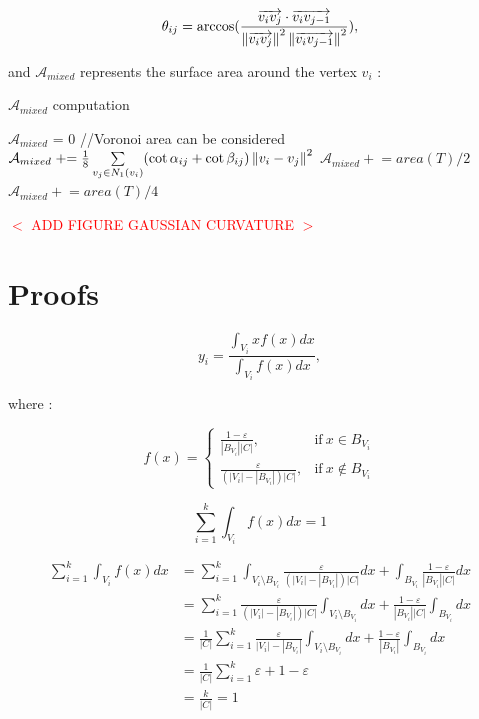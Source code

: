 \documentclass[11pt,fleqn]{book} %
\newcommand{\arnaud}[1]{\textcolor{red}{$<$ #1 $>$}}
\begin{document}
\begin{appendices}
\begin{equation}
	\theta_{ij} = \arccos(\frac{\overrightarrow{v_iv_j} \cdot \overrightarrow{v_i v_{j-1}}}
	{\left\lVert\overrightarrow{v_iv_j}\right\rVert^2\left\lVert\overrightarrow{v_iv_{j-1}}\right\rVert^2}),
\end{equation} 

and $\mathcal{A}_{mixed}$ represents the surface area around the vertex $v_i$ : 

\begin{algorithm}
\caption{$\mathcal{A}_{mixed}$ computation}
\begin{algorithmic}
\State $\mathcal{A}_{mixed}$ = 0
		//Voronoi area can be considered
		\State $\mathcal{A}_{mixed} \mathrel{+}= \frac{1}{8} \sum\limits_{v_j \in N_1(v_i)} (\cot \alpha_{ij} + \cot \beta_{ij}) \left\lVert v_i-v_j\right\rVert^2$
	\Else
			\State $\mathcal{A}_{mixed} \mathrel{+}= area(T)/2$
		\Else
			\State $\mathcal{A}_{mixed} \mathrel{+}= area(T)/4$
		\EndIf
	\EndIf
\EndFor
\end{algorithmic}
\end{algorithm}

\arnaud{ADD FIGURE GAUSSIAN CURVATURE}

\section{Proofs}

\begin{equation}
	y_i = \frac{\int_{V_i}xf(x)dx}{\int_{V_i}f(x)dx},
\end{equation}

where : 

\begin{equation}
	f(x) = 
    \begin{cases}
      \frac{1-\varepsilon}{|B_{V_i}||C|}, & \text{if}\ x \in B_{V_i} \\
      \frac{\varepsilon}{(|V_i|-|B_{V_i}|)|C|}, & \text{if}\ x \not\in B_{V_i}
    \end{cases}
\end{equation}

\begin{equation}
	\sum_{i=1}^k \int_{V_i}f(x)dx = 1
\end{equation}

\begin{align*}
	\sum_{i=1}^k \int_{V_i}f(x)dx 
	&= \sum_{i=1}^k \int_{V_i \setminus B_{V_i}}\frac{\varepsilon}{(|V_i|-|B_{V_i}|)|C|}dx + \int_{B_{V_i}}\frac{1-\varepsilon}{|B_{V_i}||C|}dx \\
	&= \sum_{i=1}^k \frac{\varepsilon}{(|V_i|-|B_{V_i}|)|C|}\int_{V_i \setminus B_{V_i}}dx + \frac{1-\varepsilon}{|B_{V_i}||C|}\int_{B_{V_i}}dx \\
	&= \frac{1}{|C|} \sum_{i=1}^k \frac{\varepsilon}{|V_i|-|B_{V_i}|}\int_{V_i \setminus B_{V_i}}dx + \frac{1-\varepsilon}{|B_{V_i}|}\int_{B_{V_i}}dx \\
	&= \frac{1}{|C|} \sum_{i=1}^k \varepsilon + 1 - \varepsilon\\
	&= \frac{k}{|C|} = 1
\end{align*}

\end{appendices}

\end{document}
